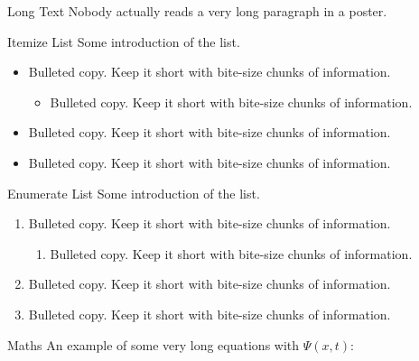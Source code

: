 \documentclass{purdue-poster}
\title{\VERYHuge{A Purdue \LaTeX\ Poster Template}}
\author{\Large{A Purdue Student\texorpdfstring{\textsuperscript{1}}{}, A Duepur Student\texorpdfstring{\textsuperscript{2}}{}}}
\institute
{Purdue University\texorpdfstring{\textsuperscript{1}}{}, Duepur University\texorpdfstring{\textsuperscript{2}},\\
Accepted for Overleaf Template}
\date{\today}
\begin{document}
\begin{frame}{}
    \begin{columns}[c]
    \begin{column}{.45\linewidth}
    \begin{block}{\large Long Text}
        Nobody actually reads a very long paragraph in a poster.

        \bigskip

        \lipsum[2]

        \lipsum[2]
    \end{block}

    \begin{block}{Itemize List}
        Some introduction of the list.
        \begin{itemize}
            \item Bulleted copy. Keep it short with bite-size chunks of information.
            \begin{itemize}
                \item Bulleted copy. Keep it short with bite-size chunks of information.
            \end{itemize}
            \item Bulleted copy. Keep it short with bite-size chunks of information.
            \item Bulleted copy. Keep it short with bite-size chunks of information.
        \end{itemize}
    \end{block}

    \begin{block}{Enumerate List}
        Some introduction of the list.
        \begin{enumerate}
            \item Bulleted copy. Keep it short with bite-size chunks of information.
            \begin{enumerate}
                \item Bulleted copy. Keep it short with bite-size chunks of information.
            \end{enumerate}
            \item Bulleted copy. Keep it short with bite-size chunks of information.
            \item Bulleted copy. Keep it short with bite-size chunks of information.
        \end{enumerate}
    \end{block}

    \begin{block}{Maths}
        An example of some very long equations with $\Psi (x,t)$:
        

\end{block}
\end{column}
\end{columns}
\end{frame}
\end{document}
